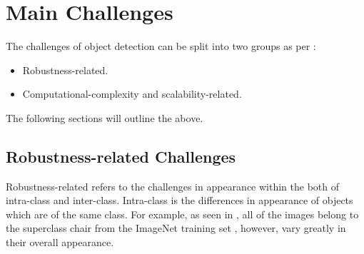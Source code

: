 \section{Main Challenges}\label{sec:probchallenges}
The challenges of object detection can be split into two groups as per \cite{zhang}:

\begin{itemize}
	\item Robustness-related.
	\item Computational-complexity and scalability-related.
\end{itemize}

The following sections will outline the above.

\subsection{Robustness-related Challenges}

Robustness-related refers to the challenges in appearance within the both of intra-class and inter-class. Intra-class is the differences in appearance of objects which are of the same class. For example, as seen in , all of the images belong to the superclass chair from the ImageNet training set \cite{imagenet}, however, vary greatly in their overall appearance. 

